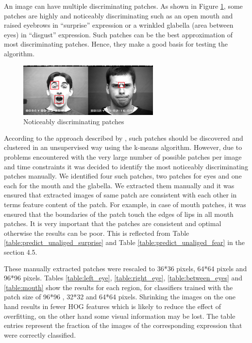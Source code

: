 An image can have multiple discriminating patches. As shown in Figure \ref{fig:manual_patch}, some patches are highly and noticeably discriminating such as an open mouth and raised eyebrows in "`surprise"' expression or a wrinkled glabella (area between eyes) in "`disgust"' expression. Such patches can be the best approximation of most discriminating patches. Hence, they make a good basis for testing the algorithm.

\begin{figure}
\centering
\includegraphics[width=200pt]{img/manual_patch.png}
  \caption{Noticeably discriminating patches}
  \label{fig:manual_patch}
\end{figure}

According to the approach described by \cite{Singh2012DiscPat}, such patches should be discovered and clustered in an unsupervised way using the k-means algorithm. However, due to problems encountered with the very large number of possible patches per image and time constraints it was decided to identify the most noticeably discriminating patches manually. We identified four such patches, two patches for eyes and one each for the mouth and the glabella. We extracted them manually and it was ensured that extracted images of same patch are consistent with each other in terms feature content of the patch. For example, in case of mouth patches, it was ensured that the boundaries of the patch touch the edges of lips in all mouth patches. It is very important that the patches are consistent and optimal otherwise the results can be poor. This is reflected from Table \ref{table:predict_unaliged_surprise} and Table \ref{table:predict_unaliged_fear} in the section 4.5.


These manually extracted patches were rescaled to 36*36 pixels, 64*64 pixels and 96*96 pixels. Tables \ref{table:left_eye}, \ref{table:right_eye}, \ref{table:between_eyes} and \ref{table:mouth} show the results for each region, for classifiers trained with the patch size of 96*96 , 32*32 and 64*64 pixels. Shrinking the images on the one hand results in fewer HOG features which is likely to reduce the effect of overfitting, on the other hand some visual information may be lost. The table entries represent the fraction of the images of the corresponding expression that were correctly classified.

